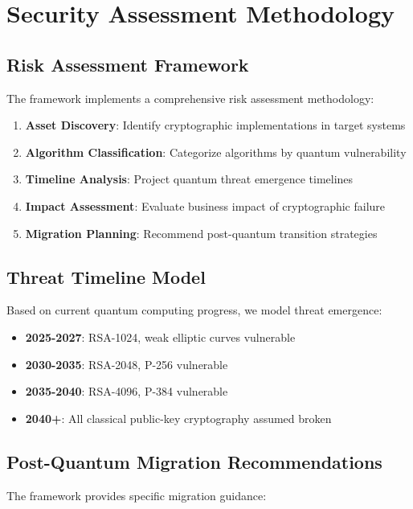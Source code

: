 \documentclass[11pt]{article}
\begin{document}
\section{Security Assessment Methodology}

\subsection{Risk Assessment Framework}

The framework implements a comprehensive risk assessment methodology:

\begin{enumerate}
\item \textbf{Asset Discovery}: Identify cryptographic implementations in target systems
\item \textbf{Algorithm Classification}: Categorize algorithms by quantum vulnerability
\item \textbf{Timeline Analysis}: Project quantum threat emergence timelines
\item \textbf{Impact Assessment}: Evaluate business impact of cryptographic failure
\item \textbf{Migration Planning}: Recommend post-quantum transition strategies
\end{enumerate}

\subsection{Threat Timeline Model}

Based on current quantum computing progress, we model threat emergence:

\begin{itemize}
\item \textbf{2025-2027}: RSA-1024, weak elliptic curves vulnerable
\item \textbf{2030-2035}: RSA-2048, P-256 vulnerable
\item \textbf{2035-2040}: RSA-4096, P-384 vulnerable
\item \textbf{2040+}: All classical public-key cryptography assumed broken
\end{itemize}

\subsection{Post-Quantum Migration Recommendations}

The framework provides specific migration guidance:
\end{document}
